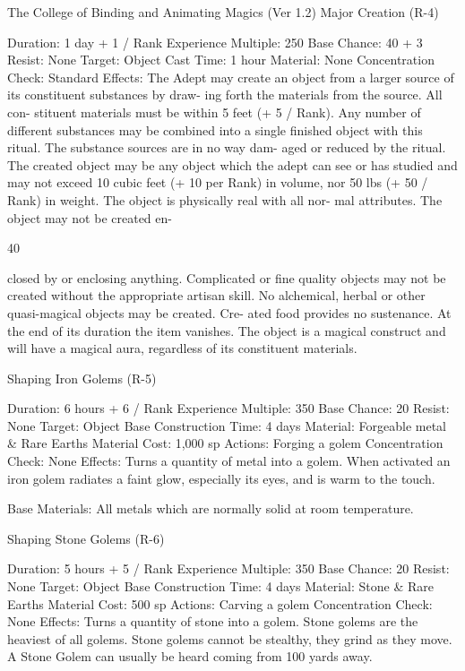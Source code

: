 \begin{Chapter}{The College of Binding and Animating Magics (Ver 1.2)}
Major Creation (R-4) 

Duration: 1 day + 1 / Rank 
Experience Multiple: 250 
Base Chance: 40 + 3%
Resist: None 
Target: Object 
Cast Time: 1 hour 
Material: None 
Concentration Check: Standard 
Effects:  The  Adept  may  create  an  object  from  a 
larger source of its constituent substances by draw-
ing  forth  the  materials  from  the  source.  All  con-
stituent  materials  must  be  within  5  feet  (+  5  / 
Rank). Any number of different substances may be 
combined  into  a  single  finished  object  with  this 
ritual.  The  substance  sources  are  in  no  way  dam-
aged  or  reduced  by  the  ritual.  The  created  object 
may  be  any  object  which  the  adept can  see  or  has 
studied and may not exceed 10 cubic feet (+ 10 per 
Rank)  in  volume,  nor  50  lbs  (+  50  /  Rank)  in 
weight.  The  object  is  physically  real  with  all  nor-
mal  attributes.  The  object  may  not  be  created  en-

40 

closed  by  or  enclosing  anything.  Complicated  or 
fine quality objects may not be created without the 
appropriate  artisan  skill.  No  alchemical,  herbal  or 
other  quasi-magical  objects  may  be  created.  Cre-
ated food provides no sustenance. At the end of its 
duration the item vanishes. The object is a magical 
construct  and  will  have  a  magical  aura,  regardless 
of its constituent materials. 

Shaping Iron Golems (R-5) 

Duration: 6 hours + 6 / Rank 
Experience Multiple: 350 
Base Chance: 20%
Resist: None 
Target: Object 
Base Construction Time: 4 days 
Material: Forgeable metal \& Rare Earths 
Material Cost: 1,000 sp 
Actions: Forging a golem 
Concentration Check: None 
Effects:  Turns  a  quantity  of  metal  into  a  golem. 
When  activated  an  iron  golem  radiates  a  faint 
glow, especially its eyes, and is warm to the touch. 

Base  Materials:  All  metals  which  are  normally 
solid at room temperature. 

Shaping Stone Golems (R-6) 

Duration: 5 hours + 5 / Rank 
Experience Multiple: 350 
Base Chance: 20%
Resist: None 
Target: Object 
Base Construction Time: 4 days 
Material: Stone \& Rare Earths Material Cost: 500 
sp 
Actions: Carving a golem 
Concentration Check: None 
Effects:  Turns  a  quantity  of  stone  into  a  golem. 
Stone golems are the heaviest of all golems. Stone 
golems  cannot  be  stealthy,  they  grind  as  they 
move. A Stone Golem can usually be heard coming 
from 100 yards away. 


\end{Chapter}
